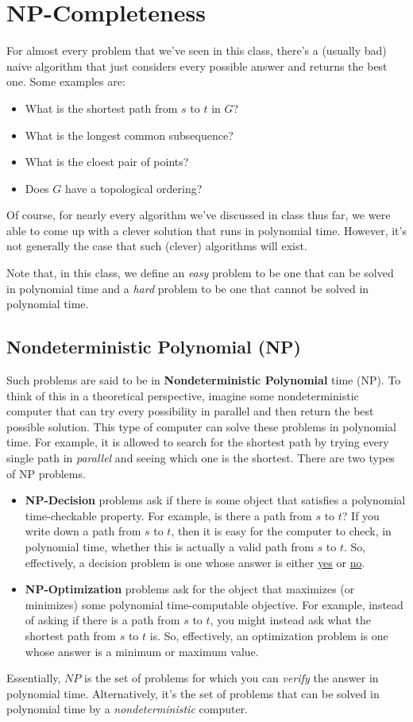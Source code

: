 \documentclass[letterpaper]{article}
\begin{document}
\section{NP-Completeness}
For almost every problem that we've seen in this class, there's a (usually bad) naive algorithm that just considers every possible answer and returns the best one. Some examples are: 
\begin{itemize}
    \item What is the shortest path from $s$ to $t$ in $G$? 
    \item What is the longest common subsequence? 
    \item What is the cloest pair of points? 
    \item Does $G$ have a topological ordering?
\end{itemize}
Of course, for nearly every algorithm we've discussed in class thus far, we were able to come up with a clever solution that runs in polynomial time. However, it's not generally the case that such (clever) algorithms will exist. 

\bigskip 

Note that, in this class, we define an \emph{easy} problem to be one that can be solved in polynomial time and a \emph{hard} problem to be one that cannot be solved in polynomial time. 

\subsection{Nondeterministic Polynomial (NP)}
Such problems are said to be in \textbf{Nondeterministic Polynomial} time (NP). To think of this in a theoretical perspective, imagine some nondeterministic computer that can try every possibility in parallel and then return the best possible solution. This type of computer can solve these problems in polynomial time. For example, it is allowed to search for the shortest path by trying every single path in \emph{parallel} and seeing which one is the shortest. There are two types of NP problems.
\begin{itemize}
    \item \textbf{NP-Decision} problems ask if there is some object that satisfies a polynomial time-checkable property. For example, is there a path from $s$ to $t$? If you write down a path from $s$ to $t$, then it is easy for the computer to check, in polynomial time, whether this is actually a valid path from $s$ to $t$. So, effectively, a decision problem is one whose answer is either \underline{yes} or \underline{no}.
    \item \textbf{NP-Optimization} problems ask for the object that maximizes (or minimizes) some polynomial time-computable objective. For example, instead of asking if there is a path from $s$ to $t$, you might instead ask what the shortest path from $s$ to $t$ is. So, effectively, an optimization problem is one whose answer is a minimum or maximum value. 
\end{itemize}
Essentially, $NP$ is the set of problems for which you can \emph{verify} the answer in polynomial time. Alternatively, it's the set of problems that can be solved in polynomial time by a \emph{nondeterministic} computer. 
\end{document}

